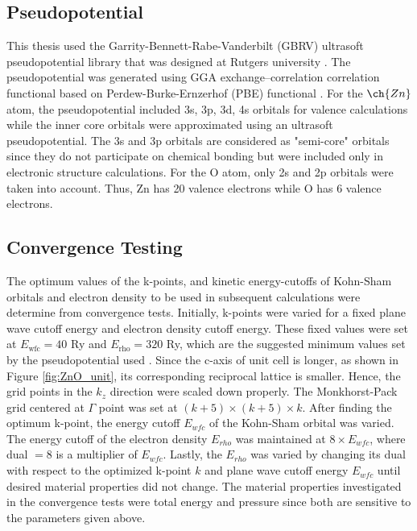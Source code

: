     \subsection{Pseudopotential}
    This thesis used the Garrity-Bennett-Rabe-Vanderbilt (GBRV) ultrasoft pseudopotential library that was designed at Rutgers university \citep{Garrity2014}. The pseudopotential was generated using GGA exchange–correlation correlation functional based on Perdew-Burke-Ernzerhof (PBE) functional \citep{Perdew1996}. For the $\ch{Zn}$ atom, the pseudopotential included 3s, 3p, 3d, 4s orbitals for valence calculations  while the inner core orbitals were approximated using an ultrasoft pseudopotential. The 3s and 3p orbitals are considered as "semi-core" orbitals since they do not participate on chemical bonding but were included only in electronic structure calculations. For the O atom, only  2s and 2p orbitals were taken into account. Thus, Zn has 20 valence electrons while O has 6 valence electrons. 

    \subsection{Convergence Testing}
    The optimum values of the k-points, and kinetic energy-cutoffs  of  Kohn-Sham orbitals and electron density to be used in subsequent calculations were determine from convergence tests. Initially, k-points were varied for a fixed plane wave cutoff energy and electron density cutoff energy. These fixed values were set at $E_{\text{wfc}} = 40$ Ry and $E_{\text{rho}} = 320$ Ry, which are the suggested minimum values set by the pseudopotential used \citep{Garrity2014}.  Since the c-axis of  unit cell is longer, as shown in Figure \ref{fig:ZnO_unit}, its corresponding reciprocal lattice is smaller. Hence, the grid points in the $k_z$ direction were scaled down properly. The Monkhorst-Pack grid centered at $\Gamma$ point was set at $(k+5) \times (k +5 ) \times k$. After finding the optimum k-point, the energy cutoff $E_{wfc}$ of the Kohn-Sham orbital was varied. The energy cutoff of the electron density $E_{rho}$ was maintained at $8 \times E_{wfc}$, where dual $=8$ is a multiplier of $E_{wfc}$. Lastly, the $E_{rho}$ was varied by changing its dual with respect to the optimized k-point $k$ and plane wave cutoff energy $E_{wfc}$ until desired material properties did not change. The material properties investigated in the convergence tests were total energy and pressure since both are sensitive to the parameters given above. 


